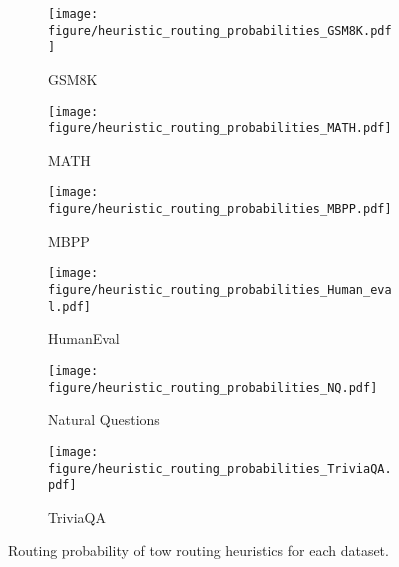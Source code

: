 \begin{figure}[!t]
    \centering
    \begin{subfigure}[b]{0.48\columnwidth}
        \centering
        \texttt{[image: figure/heuristic\_routing\_probabilities\_GSM8K.pdf]}
        \caption{GSM8K}
    \end{subfigure}
    \begin{subfigure}[b]{0.48\columnwidth}
        \centering
        \texttt{[image: figure/heuristic\_routing\_probabilities\_MATH.pdf]}
        \caption{MATH}
    \end{subfigure}
    \hfill
    \begin{subfigure}[b]{0.48\columnwidth}
        \centering
        \texttt{[image: figure/heuristic\_routing\_probabilities\_MBPP.pdf]}
        \caption{MBPP}
    \end{subfigure}
    \begin{subfigure}[b]{0.48\columnwidth}
        \centering
        \texttt{[image: figure/heuristic\_routing\_probabilities\_Human\_eval.pdf]}
        \caption{HumanEval}
    \end{subfigure}

    \centering
    \begin{subfigure}[b]{0.48\columnwidth}
        \centering
        \texttt{[image: figure/heuristic\_routing\_probabilities\_NQ.pdf]}
        \caption{Natural Questions}
    \end{subfigure}
    \begin{subfigure}[b]{0.48\columnwidth}
        \centering
        \texttt{[image: figure/heuristic\_routing\_probabilities\_TriviaQA.pdf]}
        \caption{TriviaQA}
    \end{subfigure}
    \caption{\label{fig:routing_heuristic} Routing probability of tow routing heuristics for each dataset.}
\end{figure}

